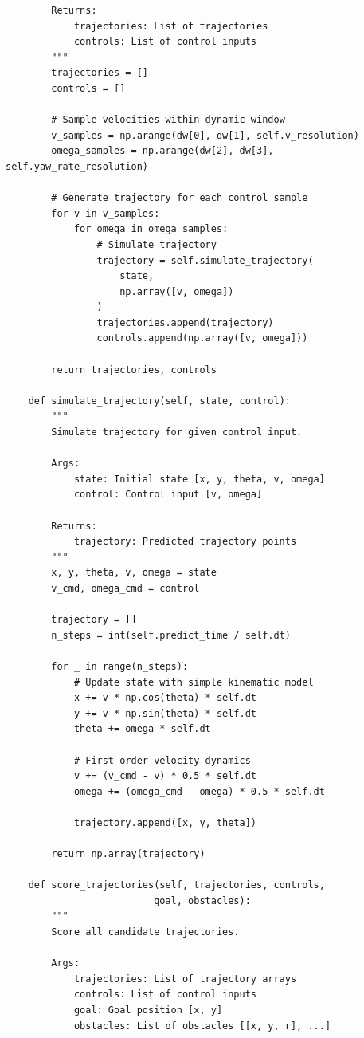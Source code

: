 \begin{lstlisting}
        Returns:
            trajectories: List of trajectories
            controls: List of control inputs
        """
        trajectories = []
        controls = []
        
        # Sample velocities within dynamic window
        v_samples = np.arange(dw[0], dw[1], self.v_resolution)
        omega_samples = np.arange(dw[2], dw[3], self.yaw_rate_resolution)
        
        # Generate trajectory for each control sample
        for v in v_samples:
            for omega in omega_samples:
                # Simulate trajectory
                trajectory = self.simulate_trajectory(
                    state, 
                    np.array([v, omega])
                )
                trajectories.append(trajectory)
                controls.append(np.array([v, omega]))
        
        return trajectories, controls
    
    def simulate_trajectory(self, state, control):
        """
        Simulate trajectory for given control input.
        
        Args:
            state: Initial state [x, y, theta, v, omega]
            control: Control input [v, omega]
            
        Returns:
            trajectory: Predicted trajectory points
        """
        x, y, theta, v, omega = state
        v_cmd, omega_cmd = control
        
        trajectory = []
        n_steps = int(self.predict_time / self.dt)
        
        for _ in range(n_steps):
            # Update state with simple kinematic model
            x += v * np.cos(theta) * self.dt
            y += v * np.sin(theta) * self.dt
            theta += omega * self.dt
            
            # First-order velocity dynamics
            v += (v_cmd - v) * 0.5 * self.dt
            omega += (omega_cmd - omega) * 0.5 * self.dt
            
            trajectory.append([x, y, theta])
        
        return np.array(trajectory)
    
    def score_trajectories(self, trajectories, controls, 
                          goal, obstacles):
        """
        Score all candidate trajectories.
        
        Args:
            trajectories: List of trajectory arrays
            controls: List of control inputs
            goal: Goal position [x, y]
            obstacles: List of obstacles [[x, y, r], ...]
            

\end{lstlisting}
